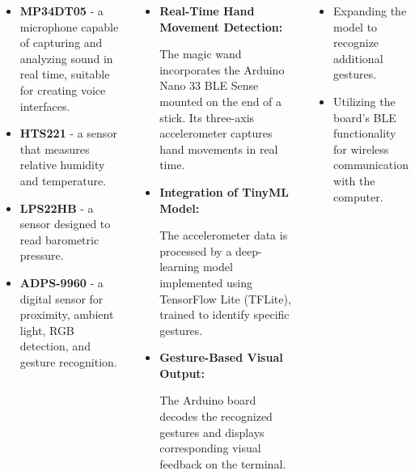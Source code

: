 \documentclass[25pt,a0paper, portrait]{tikzposter}
\begin{document}
\begin{columns}
{{\begin{itemize}
					\item \textbf{MP34DT05} - a microphone capable of capturing and analyzing sound in real time, suitable for creating voice interfaces.
					
					\item \textbf{HTS221} - a sensor that measures relative humidity and temperature.
					
					\item \textbf{LPS22HB} - a sensor designed to read barometric pressure.
					
					\item \textbf{ADPS-9960} - a digital sensor for proximity, ambient light, RGB detection, and gesture recognition.
					
				\end{itemize}
				
			}

			{
		
				\begin{itemize}			
					
					\item \textbf{Real-Time Hand Movement Detection:}
					
					The magic wand incorporates the Arduino Nano 33 BLE Sense mounted on the end of a stick. Its three-axis accelerometer captures hand movements in real time.
					
					\item \textbf{Integration of TinyML Model:}
					
					The accelerometer data is processed by a deep-learning model implemented using TensorFlow Lite (TFLite), trained to identify specific gestures.
					
					\item \textbf{Gesture-Based Visual Output:}
					
					The Arduino board decodes the recognized gestures and displays corresponding visual feedback on the terminal.
					
				\end{itemize}
				
		}

			
			{
				
				\begin{itemize}
					
					\item Expanding the model to recognize additional gestures.
					
					\item Utilizing the board's BLE functionality for wireless communication with the computer.
					

\end{itemize}}}
\end{columns}
\end{document}
